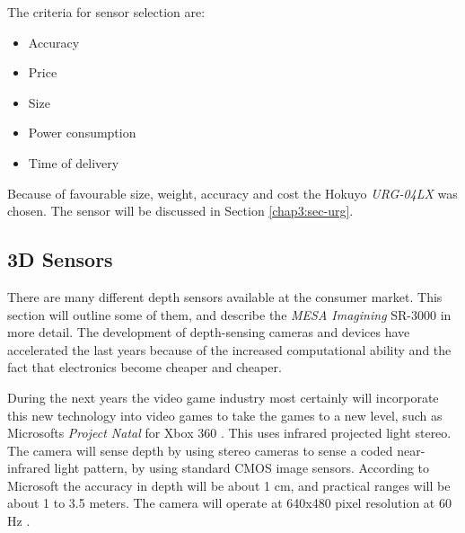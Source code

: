 The criteria for sensor selection are:
\begin{itemize}
    \item Accuracy
    \item Price
    \item Size
    \item Power consumption
    \item Time of delivery
\end{itemize}
Because of favourable size, weight, accuracy and cost the Hokuyo \emph{URG-04LX} was
chosen. The sensor will be discussed in Section \ref{chap3:sec-urg}.

\subsection{3D Sensors}
There are many different depth sensors available at the consumer market. This section will
outline some of them, and describe the \emph{MESA Imagining} SR-3000 in more detail.
The development of depth-sensing cameras and devices have accelerated the last years
because of the increased computational ability and the fact that electronics become
cheaper and cheaper. \cite{low-cost-depthcameras}

During the next years the video game industry most certainly will
incorporate this new technology into video games to take the games to a new level, such as
Microsofts \emph{Project Natal} for Xbox 360 \cite{project-natal}. This uses infrared
projected light stereo. The camera will sense depth by using stereo cameras to sense a
coded near-infrared light pattern, by using standard CMOS image sensors. According to
Microsoft the accuracy in depth will be about 1 cm, and practical ranges will be about
1 to 3.5 meters. The camera will operate at 640x480 pixel resolution at 60 Hz
\cite{conceivably-tech}.




